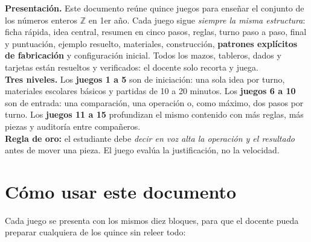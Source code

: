 \documentclass[12pt, letterpaper]{article}
\newcommand{\Z}{\mathbb{Z}}
\begin{document}

\vspace{4pt}
\begin{cuadroinfo}
  \small
  \textbf{Presentación.} Este documento reúne quince juegos para enseñar el conjunto de los números enteros $\Z$ en 1er año. Cada juego sigue \emph{siempre la misma estructura}: ficha rápida, idea central, resumen en cinco pasos, reglas, turno paso a paso, final y puntuación, ejemplo resuelto, materiales, construcción, \textbf{patrones explícitos de fabricación} y configuración inicial. Todos los mazos, tableros, dados y tarjetas están resueltos y verificados: el docente solo recorta y juega.\\[4pt]
  \textbf{Tres niveles.} Los \textbf{juegos 1 a 5} son de iniciación: una sola idea por turno, materiales escolares básicos y partidas de 10 a 20 minutos. Los \textbf{juegos 6 a 10} son de entrada: una comparación, una operación o, como máximo, dos pasos por turno. Los \textbf{juegos 11 a 15} profundizan el mismo contenido con más reglas, más piezas y auditoría entre compañeros.\\[4pt]
  \textbf{Regla de oro:} el estudiante debe \emph{decir en voz alta la operación y el resultado} antes de mover una pieza. El juego evalúa la justificación, no la velocidad.
\end{cuadroinfo}

\setcounter{tocdepth}{1}
\newpage
\tableofcontents
\newpage

\section*{Cómo usar este documento}

Cada juego se presenta con los mismos diez bloques, para que el docente pueda preparar cualquiera de los quince sin releer todo:
\end{document}
